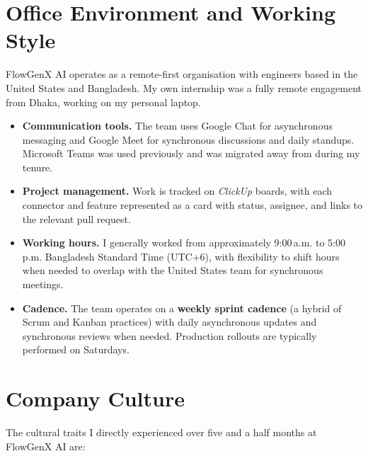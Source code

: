 \section{Office Environment and Working Style}
FlowGenX AI operates as a remote-first organisation with engineers
based in the United States and Bangladesh. My own internship was a
fully remote engagement from Dhaka, working on my personal laptop.

\begin{itemize}[leftmargin=*]
    \item \textbf{Communication tools.} The team uses Google Chat for
    asynchronous messaging and Google Meet for synchronous discussions
    and daily standups. Microsoft Teams was used previously and was
    migrated away from during my tenure.

    \item \textbf{Project management.} Work is tracked on
    \emph{ClickUp} boards, with each connector and feature represented
    as a card with status, assignee, and links to the relevant pull
    request.

    \item \textbf{Working hours.} I generally worked from
    approximately 9:00\,a.m. to 5:00\,p.m. Bangladesh Standard Time
    (UTC+6), with flexibility to shift hours when needed to overlap
    with the United States team for synchronous meetings.

    \item \textbf{Cadence.} The team operates on a \textbf{weekly
    sprint cadence} (a hybrid of Scrum and Kanban practices) with
    daily asynchronous updates and synchronous reviews when needed.
    Production rollouts are typically performed on Saturdays.
\end{itemize}

\section{Company Culture}
The cultural traits I directly experienced over five and a half
months at FlowGenX AI are:

